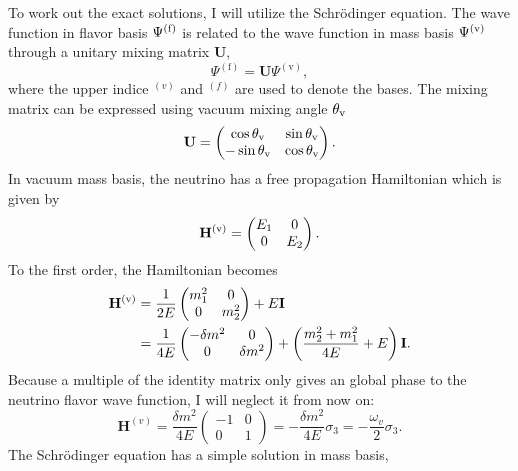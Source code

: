 To work out the exact solutions, I will utilize the Schr\"{o}dinger equation. The wave function in flavor basis $\Psi^{(\mathrm f)}$ is related to the wave function in mass basis $\Psi^{(\mathrm v)}$ through a unitary mixing matrix $\mathbf U$,
\begin{equation}
\Psi^{(\mathrm f)} = \mathbf{U}\Psi^{(\mathrm v)},
\label{chap:vacuum-eqn:wavefunction}
\end{equation}
where the upper indice ${}^{(v)}$ and ${}^{(f)}$ are used to denote the bases. The mixing matrix can be expressed using vacuum mixing angle $\theta_{\mathrm v}$
\begin{equation}
\mathbf{U} = \begin{pmatrix} \cos\theta_\mathrm v & \sin \theta_\mathrm v \\ -\sin \theta_\mathrm v & \cos \theta_\mathrm v \end{pmatrix}.
\end{equation}
In vacuum mass basis, the neutrino has a free propagation Hamiltonian which is given by
\begin{equation}
\mathbf H^{(\mathrm v)} = \begin{pmatrix} E_1 & 0 \\
0 & E_2
\end{pmatrix}.
\end{equation}
To the first order, the Hamiltonian becomes
\begin{align}
\mathbf H^{(\mathrm v)} &= \frac{1}{2E} \begin{pmatrix}
m_1^2 & 0 \\
0 & m_2^2
\end{pmatrix} + E \mathbf{I} \nonumber \\
& =  \frac{1}{4E} \begin{pmatrix}
 - \delta m^2 & 0 \\
0 & \delta m^2
\end{pmatrix}  + \left(\frac{m_2^2 + m_1^2}{4E}  + E \right) \mathbf{I}.
\end{align}
Because a multiple of the identity matrix only gives an global phase to the neutrino flavor wave function, I will neglect it from now on:
\begin{equation}
\mathbf H^{(v)} =  \frac{\delta m^2}{4E} \begin{pmatrix}
-1 & 0 \\
0 & 1
\end{pmatrix} = -\frac{\delta m^2}{4E} \sigma_3 = -\frac{\omega_{v}}{2}\sigma_3.
\end{equation}
The Schr\"{o}dinger equation has a simple solution in mass basis,
